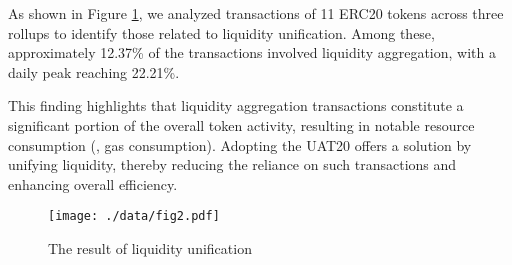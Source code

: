 




As shown in Figure \ref{fig:r2}, we analyzed transactions of 11 ERC20 tokens across three rollups to identify those related to liquidity unification. Among these, approximately 12.37\% of the transactions involved liquidity aggregation, with a daily peak reaching 22.21\%. 

This finding highlights that liquidity aggregation transactions constitute a significant portion of the overall token activity, resulting in notable resource consumption (\eg, gas consumption). Adopting the UAT20 offers a solution by unifying liquidity, thereby reducing the reliance on such transactions and enhancing overall efficiency.

\begin{figure}[h!]
\centering
\texttt{[image: ./data/fig2.pdf]}
\caption{\label{fig:r2} The result of liquidity unification}
\end{figure}





